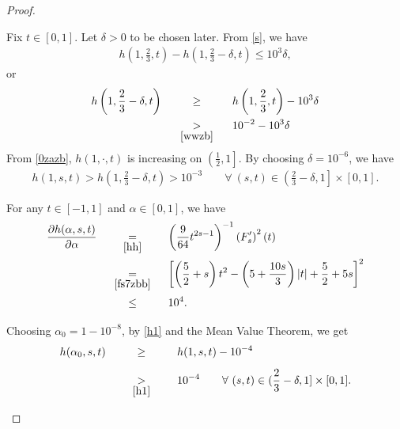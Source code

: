 \documentclass[11pt, a4paper]{article}
\numberwithin{equation}{section}
\newcommand{\coex}[2][\hphantom{longexplanation}]{%
  \underset{{#1}}{\overset{\hphantom{longexplanation}}{#2}}
}
\newcommand{\abs}[1]{\left\lvert #1\right\rvert}
\begin{document}
\begin{proof}
\begin{description}[wide]
\item[Step 3.] Fix $t\in [0,1].$ Let $\delta > 0$ to be chosen later.
From \eqref{s}, we have 
\begin{align*}
h \left( 1, \frac{2}{3}, t \right) - h \left( 1, \frac{2}{3}-\delta, t
  \right)
  \le 10^3 \delta,
\end{align*}
or 
\begin{align*}
  h \left( 1, \frac{2}{3}-\delta,t \right)
  &\coex{\ge} h \left( 1, \frac{2}{3}, t \right) - 10^3 \delta\\ &\coex[\eqref{wwzb}]{>} 10^{-2} - 10^3\delta
\end{align*}
From \eqref{0zazb}, $h \left( 1, \cdot, t \right)$ is increasing on
$\left( \frac{1}{2}, 1 \right].$ By choosing $\delta = 10^{-6}$, we have 
\begin{align}
 h(1,s,t)> h \left( 1, \frac{2}{3}-\delta,t \right) > 10^{-3}\qquad\forall~(s,t)\in \left(\frac{2}{3}-\delta,1 \right]\times[0,1].
 \label{h1}
\end{align}
\item[Step 4.] For any $t\in [-1,1]$ and $\alpha \in [0,1]$, we have
\begin{align*}
  \frac{\partial h(\alpha,s,t)}{\partial \alpha}
  &\coex[\eqref{hh}]{=}
    \left( \frac{9}{64}t^{2s -1} \right)^{-1} \left(F_{s}'
    \right)^{2}(t)\\
  &\coex[\eqref{fs7zbb}]{=} \left[ \left(\frac{5}{2} + s \right) t^2 -
    \left(5 + \frac{10s}{3} \right)\abs{t} + \frac{5}{2} + 5s
    \right]^{2}\\
  &\coex{\le} 10^4. 
\end{align*}
Choosing $\alpha_{0} =1-10^{-8}$, by \eqref{h1}  and the Mean Value Theorem, we get
\begin{align}
  \begin{split}
  h(\alpha_{0},s,t)&\coex{\ge} h(1,s,t) - 10^{-4}\\
  &\coex[\eqref{h1}]{>}10^{-4}\qquad\forall~(s,t)\in (\frac{2}{3}-\delta,
    1]\times [0,1].
  \end{split}
\label{alpha}
\end{align}


\end{description}
\end{proof}
\end{document}
